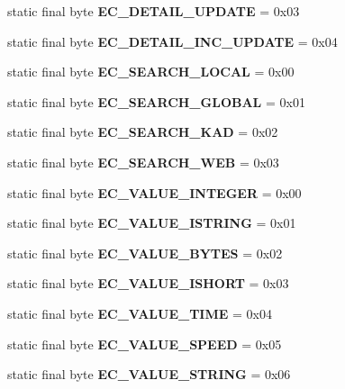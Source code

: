 \begin{DoxyCompactItemize}
\item 
static final byte {\bfseries EC\_\-DETAIL\_\-UPDATE} = 0x03\label{interfaceECCodes_a7f15fb3691360d0b7e084e05ea70f636}

\item 
static final byte {\bfseries EC\_\-DETAIL\_\-INC\_\-UPDATE} = 0x04\label{interfaceECCodes_adbf9a9f485f44aaf888e5a65d3728522}

\item 
static final byte {\bfseries EC\_\-SEARCH\_\-LOCAL} = 0x00\label{interfaceECCodes_a815b5991470a4ac63f42092d49b2a743}

\item 
static final byte {\bfseries EC\_\-SEARCH\_\-GLOBAL} = 0x01\label{interfaceECCodes_a6039c8fda3ba68c0dc14098e54bbcc3c}

\item 
static final byte {\bfseries EC\_\-SEARCH\_\-KAD} = 0x02\label{interfaceECCodes_aafa1dd5c65b8dfd1c7e418f02f59d84f}

\item 
static final byte {\bfseries EC\_\-SEARCH\_\-WEB} = 0x03\label{interfaceECCodes_a6dabd0ae8b51beecbe0d943f516940f8}

\item 
static final byte {\bfseries EC\_\-VALUE\_\-INTEGER} = 0x00\label{interfaceECCodes_adcd24d39ddc74e83bdbbc49f9e4b4747}

\item 
static final byte {\bfseries EC\_\-VALUE\_\-ISTRING} = 0x01\label{interfaceECCodes_acc93e6c0e7548efbc543fe12910b4ae8}

\item 
static final byte {\bfseries EC\_\-VALUE\_\-BYTES} = 0x02\label{interfaceECCodes_ae36f50cc73eb42f487a09304d1672988}

\item 
static final byte {\bfseries EC\_\-VALUE\_\-ISHORT} = 0x03\label{interfaceECCodes_aa21f64442cd99f7938521d705c737b63}

\item 
static final byte {\bfseries EC\_\-VALUE\_\-TIME} = 0x04\label{interfaceECCodes_aff41843564453141c12133015d6e82ff}

\item 
static final byte {\bfseries EC\_\-VALUE\_\-SPEED} = 0x05\label{interfaceECCodes_a598226df111848c708af5c0335f56371}

\item 
static final byte {\bfseries EC\_\-VALUE\_\-STRING} = 0x06\label{interfaceECCodes_af134620e0bd58e8df5e9ac90b37e913a}


\end{DoxyCompactItemize}
